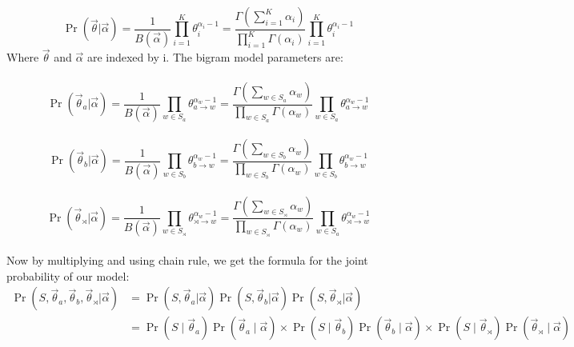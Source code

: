 \documentclass[10pt]{article}
\begin{document}
\begin{equation*}
\Pr\left(\vec{\theta}|\vec{\alpha}\right)=\frac{1}{B(\vec{\alpha})}\prod
_{i=1}^{K}\theta_{i}^{\alpha _{i}-1}= \frac{\Gamma(\sum_{i=1}^K \alpha_i)}{\prod_{i=1}^{K}
\Gamma(\alpha_i)} \prod _{i=1}^{K}\theta_{i}^{\alpha _{i}-1}
\end{equation*}
Where $\vec{\theta}$ and $\vec{\alpha}$ are indexed by i. The bigram model parameters are:
\\
\\
\begin{equation}
\Pr\left(\vec{\theta}_a|\vec{\alpha}\right)=\frac{1}{B(\vec{\alpha})}\prod
_{w \in S_a}\theta_{a \rightarrow w}^{\alpha_w -1}= \frac{\Gamma(\sum_{w \in S_a} \alpha_{w})}{\prod
_{w \in S_a}
\Gamma(\alpha_{w})} \prod
_{w \in S_a}\theta_{a \rightarrow w}^{\alpha _{w}-1}
\end{equation}
\\
\begin{equation}
\Pr\left(\vec{\theta}_b|\vec{\alpha}\right)=\frac{1}{B(\vec{\alpha})}\prod
_{w \in S_b}\theta_{b \rightarrow w}^{\alpha_w -1}= \frac{\Gamma(\sum_{w \in S_b} \alpha_{w})}{\prod
_{w \in S_b}
\Gamma(\alpha_{w})} \prod
_{w \in S_b}\theta_{b \rightarrow w}^{\alpha _{w}-1}
\end{equation}
\\
\begin{equation}
\Pr\left(\vec{\theta}_\rtimes|\vec{\alpha}\right)=\frac{1}{B(\vec{\alpha})}\prod
_{w \in S_\rtimes}\theta_{\rtimes \rightarrow w}^{\alpha_w -1}= \frac{\Gamma(\sum_{w \in S_\rtimes} \alpha_{w})}{\prod
_{w \in S_\rtimes}
\Gamma(\alpha_{w})} \prod
_{w \in S_a}\theta_{\rtimes \rightarrow w}^{\alpha _{w}-1}
\end{equation}
\\
Now by multiplying and using chain rule, we get the formula for the joint probability of our model:
\\
\begin{equation*}
\begin{aligned}
\Pr(S, \vec{\theta}_{a}, \vec{\theta}_{b}, \vec{\theta}_{\rtimes} |
\vec{\alpha}) &= \Pr(S,\vec{\theta}_a|\vec{\alpha}) \Pr(S,\vec{\theta}_b|\vec{\alpha}) \Pr(S,\vec{\theta}_\rtimes|\vec{\alpha})
\\
&=\Pr(S \mid
\vec{\theta}_a)\Pr(\vec{\theta}_a \mid \vec{\alpha}) \times \Pr(S \mid
\vec{\theta}_b)\Pr(\vec{\theta}_b \mid \vec{\alpha}) \times \Pr(S \mid
\vec{\theta}_{\rtimes})\Pr(\vec{\theta}_{\rtimes} \mid \vec{\alpha})\\
\end{aligned}
\end{equation*}
\end{document}
